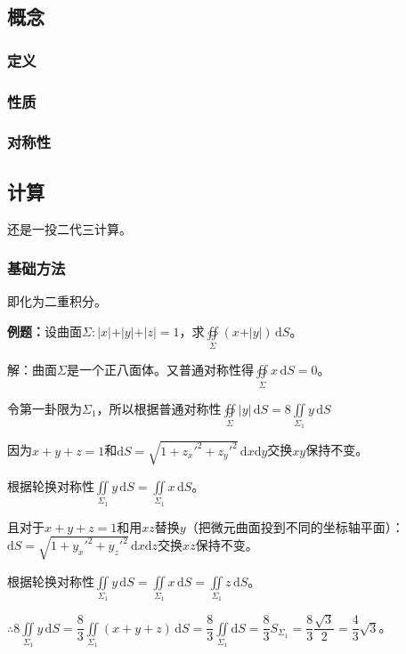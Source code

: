 \documentclass[UTF8, 12pt]{ctexart}
\begin{document}
\subsection{概念}

\subsubsection{定义}

\subsubsection{性质}

\subsubsection{对称性}

\subsection{计算}

还是一投二代三计算。

\subsubsection{基础方法}

即化为二重积分。

\textbf{例题：}设曲面$\Sigma:\vert x\vert+\vert y\vert+\vert z\vert=1$，求$\oiint\limits_\Sigma(x+\vert y\vert)\,\textrm{d}S$。

解：曲面$\Sigma$是一个正八面体。又普通对称性得$\oiint\limits_\Sigma x\,\textrm{d}S=0$。

令第一卦限为$\Sigma_1$，所以根据普通对称性$\oiint\limits_\Sigma\vert y\vert\,\textrm{d}S=8\iint\limits_{\Sigma_1}y\,\textrm{d}S$

因为$x+y+z=1$和$\textrm{d}S=\sqrt{1+z_x'^2+z_y'^2}\,\textrm{d}x\textrm{d}y$交换$xy$保持不变。

根据轮换对称性$\iint\limits_{\Sigma_1}y\,\textrm{d}S=\iint\limits_{\Sigma_1}x\,\textrm{d}S$。

且对于$x+y+z=1$和用$xz$替换$y$（把微元曲面投到不同的坐标轴平面）：$\textrm{d}S=\sqrt{1+y_x'^2+y_z'^2}\,\textrm{d}x\textrm{d}z$交换$xz$保持不变。

根据轮换对称性$\iint\limits_{\Sigma_1}y\,\textrm{d}S=\iint\limits_{\Sigma_1}x\,\textrm{d}S=\iint\limits_{\Sigma_1}z\,\textrm{d}S$。

$\therefore8\iint\limits_{\Sigma_1}y\,\textrm{d}S=\dfrac{8}{3}\iint\limits_{\Sigma_1}(x+y+z)\,\textrm{d}S=\dfrac{8}{3}\iint\limits_{\Sigma_1}\textrm{d}S=\dfrac{8}{3}S_{\Sigma_1}=\dfrac{8}{3}\dfrac{\sqrt{3}}{2}=\dfrac{4}{3}\sqrt{3}$。
\end{document}
